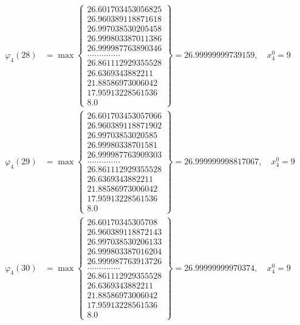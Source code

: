 \documentclass{article}
\begin{document}
\begin{align*}
  
  
  
\varphi_{4}(28) &= \max \left\{ \begin{array}{c}
26.601703453056825 \\
 26.960389118871618 \\
 26.997038530205458 \\
 26.999803387011386 \\
 26.999987763890346 \\
 .............. \\
 26.861112929355528 \\
 26.6369343882211 \\
 21.88586973006042 \\
 17.95913228561536 \\
 8.0
\end{array} \right\} = 26.99999999739159, \quad x_{4}^0 = 9\\
  
  
  
  
\varphi_{4}(29) &= \max \left\{ \begin{array}{c}
26.601703453057066 \\
 26.960389118871902 \\
 26.99703853020585 \\
 26.99980338701581 \\
 26.999987763909303 \\
 .............. \\
 26.861112929355528 \\
 26.6369343882211 \\
 21.88586973006042 \\
 17.95913228561536 \\
 8.0
\end{array} \right\} = 26.999999998817067, \quad x_{4}^0 = 9\\
  
  
  
  
\varphi_{4}(30) &= \max \left\{ \begin{array}{c}
26.60170345305708 \\
 26.960389118872143 \\
 26.997038530206133 \\
 26.999803387016204 \\
 26.999987763913726 \\
 .............. \\
 26.861112929355528 \\
 26.6369343882211 \\
 21.88586973006042 \\
 17.95913228561536 \\
 8.0
\end{array} \right\} = 26.99999999970374, \quad x_{4}^0 = 9\\
  

\end{align*}
\end{document}
